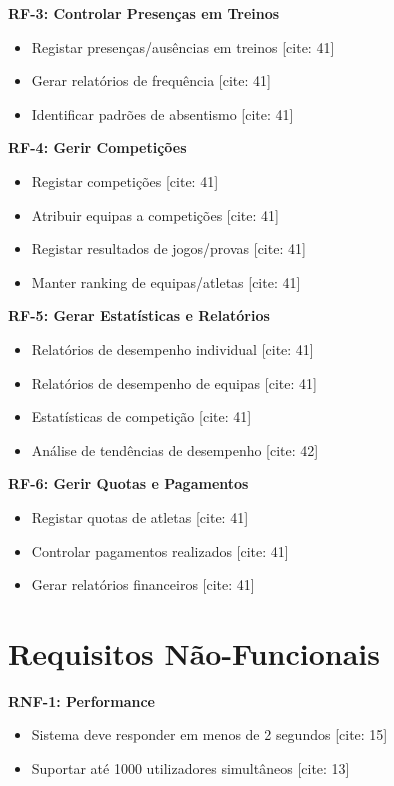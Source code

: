 \documentclass[12pt]{article}
\begin{document}
\textbf{RF-3: Controlar Presenças em Treinos}
\begin{itemize}
    \item Registar presenças/ausências em treinos [cite: 41]
    \item Gerar relatórios de frequência [cite: 41]
    \item Identificar padrões de absentismo [cite: 41]
\end{itemize}

\textbf{RF-4: Gerir Competições}
\begin{itemize}
    \item Registar competições [cite: 41]
    \item Atribuir equipas a competições [cite: 41]
    \item Registar resultados de jogos/provas [cite: 41]
    \item Manter ranking de equipas/atletas [cite: 41]
\end{itemize}

\textbf{RF-5: Gerar Estatísticas e Relatórios}
\begin{itemize}
    \item Relatórios de desempenho individual [cite: 41]
    \item Relatórios de desempenho de equipas [cite: 41]
    \item Estatísticas de competição [cite: 41]
    \item Análise de tendências de desempenho [cite: 42]
\end{itemize}

\textbf{RF-6: Gerir Quotas e Pagamentos}
\begin{itemize}
    \item Registar quotas de atletas [cite: 41]
    \item Controlar pagamentos realizados [cite: 41]
    \item Gerar relatórios financeiros [cite: 41]
\end{itemize}

\section{Requisitos Não-Funcionais}

\textbf{RNF-1: Performance}
\begin{itemize}
    \item Sistema deve responder em menos de 2 segundos [cite: 15]
    \item Suportar até 1000 utilizadores simultâneos [cite: 13]
\end{itemize}
\end{document}
